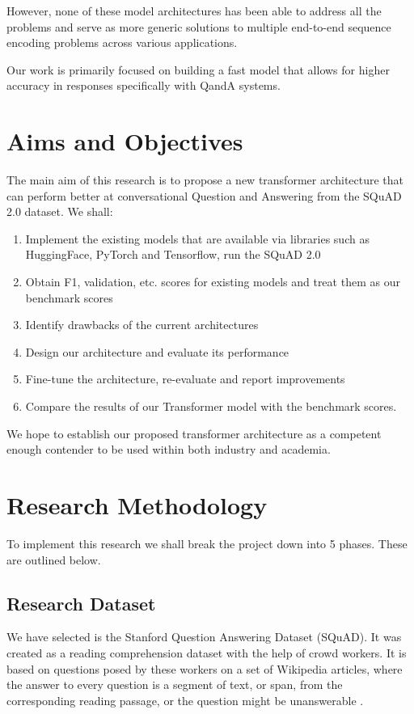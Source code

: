 \documentclass[11pt]{article}
\begin{document}
    However, none of these model architectures has been able to address all the problems and serve as more generic solutions to multiple end-to-end sequence encoding problems across various applications.

    Our work is primarily focused on building a fast model that allows for higher accuracy in responses specifically with QandA systems.

	\section{Aims and Objectives}\label{aims}

	The main aim of this research is to propose a new transformer architecture that can perform better at conversational Question and Answering from the SQuAD 2.0 dataset\citep{dataset}.
	We shall:
	\begin{enumerate}
		\item Implement the existing models that are available via libraries such as HuggingFace\citep{hfTransformers}, PyTorch and Tensorflow, run the SQuAD 2.0\citep{dataset}
		\item Obtain F1, validation, etc. scores for existing models and treat them as our benchmark scores
		\item Identify drawbacks of the current architectures
		\item Design our architecture and evaluate its performance
		\item Fine-tune the architecture, re-evaluate and report improvements
		\item Compare the results of our Transformer model with the benchmark scores.
	\end{enumerate}
	We hope to establish our proposed transformer architecture as a competent enough contender to be used within both industry and academia.
	\section{Research Methodology}\label{researchMeth}

	To implement this research we shall break the project down into 5 phases. These are outlined below.
	\subsection{Research Dataset}\label{datas}

	We have selected is the Stanford Question Answering Dataset (SQuAD). It was created as a reading comprehension dataset with the help of crowd workers. It is based on questions posed by these workers on a set of Wikipedia articles, where the answer to every question is a segment of text, or span, from the corresponding reading passage, or the question might be unanswerable \citep{dataset}.
\end{document}
